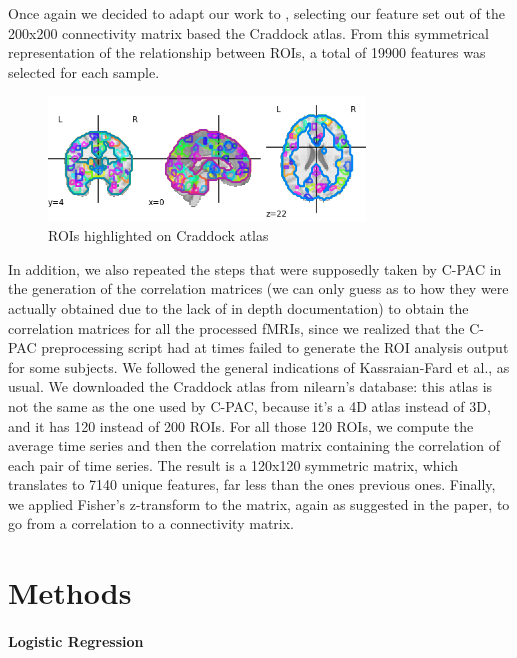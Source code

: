 \documentclass{article}
\begin{document}
Once again we decided to adapt our work to \cite{guidelinesml}, selecting our feature set out of the 200x200 connectivity matrix based the Craddock atlas. From this symmetrical representation of the relationship between ROIs, a total of 19900 features was selected for each sample.\\

\begin{figure}[h]
	\centering
	\includegraphics[width=0.75\textwidth]{atlas.png}
	\caption{ROIs highlighted on Craddock atlas}
\end{figure}

In addition, we also repeated the steps that were supposedly taken by C-PAC in the generation of the correlation matrices (we can only guess as to how they were actually obtained due to the lack of in depth documentation) to obtain the correlation matrices for all the processed fMRIs, since we realized that the C-PAC preprocessing script had at times failed to generate the ROI analysis output for some subjects. We followed the general indications of Kassraian-Fard et al.\cite{guidelinesml}, as usual. We downloaded the Craddock atlas from nilearn's\cite{neuroml} database: this atlas is not the same as the one used by C-PAC, because it's a 4D atlas instead of 3D, and it has 120 instead of 200 ROIs. For all those 120 ROIs, we compute the average time series and then the correlation matrix containing the correlation of each pair of time series. The result is a 120x120 symmetric matrix, which translates to 7140 unique features, far less than the ones previous ones. Finally, we applied Fisher's z-transform to the matrix, again as suggested in the paper, to go from a correlation to a connectivity matrix.




\section{Methods}

\paragraph{Logistic Regression}
\end{document}
